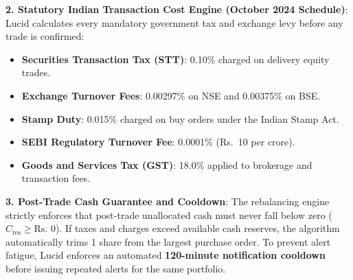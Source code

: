 \begin{table}[H]
\centering
\small
\caption{Rebalance Trade Preview: Before vs. After Allocation Realignment}
\label{tab:rebalance_preview_example}
\end{table}

\noindent \textbf{2. Statutory Indian Transaction Cost Engine (October 2024 Schedule)}:
Lucid calculates every mandatory government tax and exchange levy before any trade is confirmed:
\begin{itemize}
    \item \textbf{Securities Transaction Tax (STT)}: 0.10\% charged on delivery equity trades.
    \item \textbf{Exchange Turnover Fees}: 0.00297\% on NSE and 0.00375\% on BSE.
    \item \textbf{Stamp Duty}: 0.015\% charged on buy orders under the Indian Stamp Act.
    \item \textbf{SEBI Regulatory Turnover Fee}: 0.0001\% (Rs.~10 per crore).
    \item \textbf{Goods and Services Tax (GST)}: 18.0\% applied to brokerage and transaction fees.
\end{itemize}

\noindent \textbf{3. Post-Trade Cash Guarantee and Cooldown}:
The rebalancing engine strictly enforces that post-trade unallocated cash must never fall below zero ($C_{\text{res}} \ge \text{Rs.~}0$). If taxes and charges exceed available cash reserves, the algorithm automatically trims 1 share from the largest purchase order. To prevent alert fatigue, Lucid enforces an automated \textbf{120-minute notification cooldown} before issuing repeated alerts for the same portfolio.

